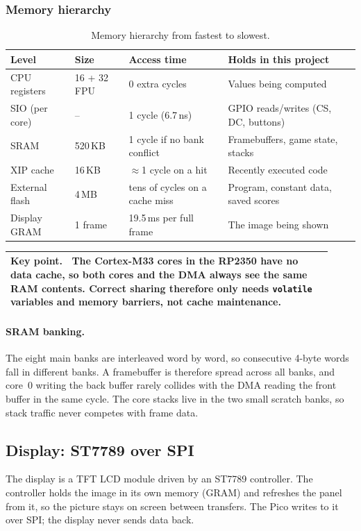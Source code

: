 \documentclass[11pt,a4paper]{article}
\newenvironment{keypoint}
  {\begin{center}\begin{tabular}{|p{0.92\linewidth}|}\hline\rule{0pt}{2.6ex}\textbf{Key point.}~}
  {\\[0.6ex]\hline\end{tabular}\end{center}}
\begin{document}
\subsubsection{Memory hierarchy}\label{sec:memhier}
\begin{table}[H]
\centering
\caption{Memory hierarchy from fastest to slowest.}\label{tab:hier}
\begin{tabularx}{\linewidth}{lllX}
\toprule
\textbf{Level} & \textbf{Size} & \textbf{Access time} & \textbf{Holds in this project} \\
\midrule
CPU registers & 16 + 32 FPU & 0 extra cycles & Values being computed \\
SIO (per core) & -- & 1 cycle (6.7\,ns) & GPIO reads/writes (CS, DC, buttons) \\
SRAM & 520\,KB & 1 cycle if no bank conflict & Framebuffers, game state, stacks \\
XIP cache & 16\,KB & $\approx$1 cycle on a hit & Recently executed code \\
External flash & 4\,MB & tens of cycles on a cache miss & Program, constant data, saved scores \\
Display GRAM & 1 frame & 19.5\,ms per full frame & The image being shown \\
\bottomrule
\end{tabularx}
\end{table}

\begin{keypoint}
The Cortex-M33 cores in the RP2350 have no data cache, so both cores and the
DMA always see the same RAM contents. Correct sharing therefore only needs
\texttt{volatile} variables and memory barriers, not cache maintenance.
\end{keypoint}

\paragraph{SRAM banking.} The eight main banks are interleaved word by word, so
consecutive 4-byte words fall in different banks. A framebuffer is therefore
spread across all banks, and core~0 writing the back buffer rarely collides
with the DMA reading the front buffer in the same cycle. The core stacks live in
the two small scratch banks, so stack traffic never competes with frame data.

\subsection{Display: ST7789 over SPI}\label{sec:display}
The display is a TFT LCD module driven by an ST7789 controller. The controller
holds the image in its own memory (GRAM) and refreshes the panel from it, so the
picture stays on screen between transfers. The Pico writes to it over SPI; the
display never sends data back.
\end{document}
